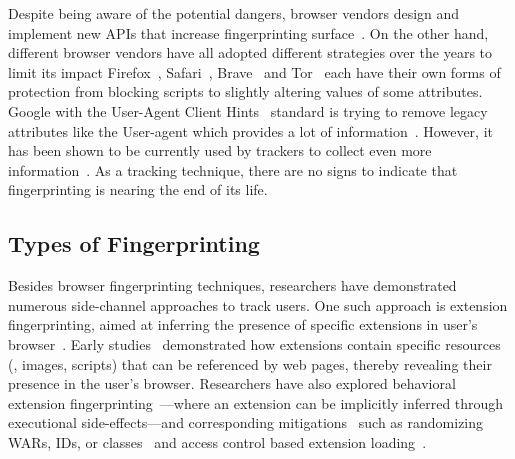 %
Despite being aware of the potential dangers, browser vendors design and implement new APIs that increase fingerprinting surface~\cite{dotyMitigatingBrowserFingerprinting2019}. 
%
On the other hand, different browser vendors have all adopted different strategies over the years to limit its impact Firefox~\cite{firefoxResistFingerprinting}, Safari~\cite{appledeveloperSafari17Release2023}, Brave~\cite{braveFingerprintingProtectionsBrave2020} and Tor~\cite{torANTIFINGERPRINTINGTorProject} each have their own forms of protection from blocking scripts to slightly altering values of some attributes. 
%
Google with the User-Agent Client Hints~\cite{taylorUserAgentClientHints2024a} standard is trying to remove legacy attributes like the User-agent which provides a lot of information~\cite{laperdrixBeautyBeastDiverting2016}.
%
However, it has been shown to be currently used by trackers to collect even more information~\cite{wieflingPrivacyMeasureTurned2024}. 
%
As a tracking technique, there are no signs to indicate that fingerprinting is nearing the end of its life.



\subsection{Types of Fingerprinting}
\label{sec:types-of-fingerprinting}


Besides browser fingerprinting techniques, researchers have demonstrated numerous side-channel approaches to track users.
%
One such approach is extension fingerprinting, aimed at inferring the presence of specific extensions in user's browser~\cite{karamiCarnusExploringPrivacy2020}. 
%
Early studies~\cite{sjostenDiscoveringBrowserExtensions2017, gulyasExtendNotExtend2018, karamiCarnusExploringPrivacy2020} demonstrated how extensions contain specific resources (\eg{}, images, scripts) that can be referenced by web pages, thereby revealing their presence in the user's browser. 
%
Researchers have also explored behavioral extension fingerprinting~\cite{starovXHOUNDQuantifyingFingerprintability2017, karamiCarnusExploringPrivacy2020, solomosDangersHumanTouch2022, solomosEscapingConfinesTime2022, laperdrixFingerprintingStyleDetecting2021, agarwalPeekingWindowFingerprinting2024}---where an extension can be implicitly inferred through executional side-effects---and corresponding mitigations~\cite{karamiUnleashSimulacrumShifting2022, sanchez-rolaExtensionBreakdownSecurity2017} such as randomizing WARs, IDs, or classes~\cite{trickelEveryoneDifferentClientside2019} and access control based extension loading~\cite{sjostenLatexGlovesProtecting2019}. 


